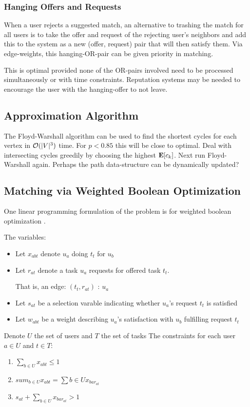 \documentclass[main.tex]{subfiles}
\begin{document}
\subsubsection{Hanging Offers and Requests}
When a user rejects a suggested match, an alternative to trashing the match for all users is to take the offer and request of the rejecting user's neighbors and add this to the system as a new (offer, request) pair that will then satisfy them. Via edge-weights, this hanging-OR-pair can be given priority in matching.

This is optimal provided none of the OR-pairs involved need to be processed simultaneously or with time constraints. Reputation systems may be needed to encourage the user with the hanging-offer to not leave.

\subsection{Approximation Algorithm}

The Floyd-Warshall algorithm can be used to find the shortest cycles for each vertex in $\mathcal{O}(|V|^3)$ time. For $p < 0.85$ this will be close to optimal. Deal with intersecting cycles greedily by choosing the highest $\mathbf{E}[c_k]$. Next run Floyd-Warshall again. Perhaps the path data-structure can be dynamically updated?

\subsection{Matching via Weighted Boolean Optimization}

One linear programming formulation of the problem is for weighted boolean optimization \cite{Mar1}.

The variables:
\begin{itemize}
  \item Let $x_{abt}$ denote $u_a$ doing $t_t$ for $u_b$
  \item Let $r_{at}$ denote a task $u_a$ requests for offered task $t_t$.

        That is, an edge: $(t_t, r_{at})$ : $u_a$
  \item Let $s_{at}$ be a selection varable indicating whether $u_a$'s request $t_t$ is satisfied
  \item Let $w_{abt}$ be a weight describing $u_a$'s satisfaction with $u_b$ fulfilling request $t_t$
\end{itemize}

Denote $U$ the set of users and $T$ the set of tasks
The constraints for each user $a \in U$ and $t \in T$:
\begin{enumerate}
  \item $\sum_{b \in U} x_{abt} \leq 1$
  \item $sum_{b \in U} x_{abt} = \sum{b \in U} x_{bar_{at}}$
  \item $s_{at} + \sum_{b \in U} x_{bar_{at}} > 1$
\end{enumerate}
\end{document}

